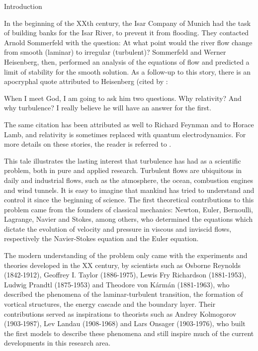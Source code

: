 \begin{chapter}{Introduction}
\label{cap1}

\hspace{5 mm}

In the beginning of the XXth century, the Isar Company of Munich
had the task of building banks for the Isar River, to prevent it from
flooding. They contacted Arnold Sommerfeld with the question:
At what point would the river flow change
from smooth (laminar) to irregular (turbulent)?
Sommerfeld and Werner Heisenberg, then, performed an
analysis of the equations of flow and predicted a limit of
stability for the smooth solution.
As a follow-up to this story, there is an apocryphal quote attributed
to Heisenberg (cited by \textcite{ball2014scientific}:
\begin{displayquote}
When I meet God, I am going to ask him two questions. Why relativity?
And why turbulence? I really believe he will have an answer for the first.
\end{displayquote}
The same citation has been attributed as well to Richard Feynman and to Horace Lamb,
and relativity is sometimes replaced with quantum electrodynamics.
For more details on these stories, the
reader is referred to \textcite{ball2014scientific,eckert2017}.

This tale illustrates the lasting interest that turbulence
has had as a scientific problem, both in pure and applied research.
Turbulent flows are ubiquitous in daily and industrial flows,
such as the atmosphere, the ocean, combustion engines and wind tunnels.
It is easy to imagine that mankind has tried to understand
and control it since the beginning of science.
The first theoretical contributions to this problem came from
the founders of classical mechanics:
Newton, Euler, Bernoulli, Lagrange, Navier and Stokes, among others, who
determined the equations which dictate the evolution
of velocity and pressure in viscous and inviscid flows,
respectively the Navier-Stokes equation and the Euler equation.

The modern understanding of the problem
only came with
the experiments and theories developed in the XX century, by scientists such as
Osborne Reynolds (1842-1912), Geoffrey I. Taylor (1886-1975),
Lewis Fry Richardson (1881-1953), Ludwig Prandtl (1875-1953)
and Theodore von Kármán (1881-1963),
who described the phenomena of the laminar-turbulent transition,
the formation of vortical structures, the energy cascade
and the boundary layer.
Their contributions served as inspirations to theorists
such as Andrey Kolmogorov (1903-1987), Lev Landau (1908-1968)
and Lars Onsager (1903-1976), who built the first models
to describe these phenomena and still inspire much of
the current developments in this research area.


\end{chapter}
